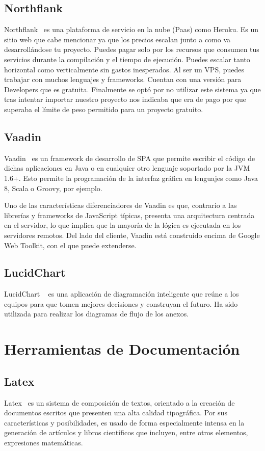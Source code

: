 \subsection{Northflank}
Northflank~\cite{Northflank} es una plataforma de servicio en la nube (Paas) como Heroku. Es un sitio web que cabe mencionar ya que los precios escalan junto a como va desarrollándose tu proyecto. Puedes pagar solo por los recursos que consumen tus servicios durante la compilación y el tiempo de ejecución. Puedes escalar tanto horizontal como verticalmente sin gastos inesperados. Al ser un VPS, puedes trabajar con muchos lenguajes y frameworks. Cuentan con una versión para Developers que es gratuita. 
Finalmente se optó por no utilizar este sistema ya que tras intentar importar nuestro proyecto nos indicaba que era de pago por que superaba el límite de peso permitido para un proyecto gratuito.

\subsection{Vaadin}
Vaadin~\cite{Vaadin} es un framework de desarrollo de SPA que permite escribir el código de dichas aplicaciones en Java o en cualquier otro lenguaje soportado por la JVM 1.6+. Esto permite la programación de la interfaz gráfica en lenguajes como Java 8, Scala o Groovy, por ejemplo.

Uno de las características diferenciadores de Vaadin es que, contrario a las librerías y frameworks de JavaScript típicas, presenta una arquitectura centrada en el servidor, lo que implica que la mayoría de la lógica es ejecutada en los servidores remotos. Del lado del cliente, Vaadin está construido encima de Google Web Toolkit, con el que puede extenderse.

\subsection{LucidChart}

LucidChart ~\cite{LucidChart} es una aplicación de diagramación inteligente que reúne a los equipos para que tomen mejores decisiones y construyan el futuro. Ha sido utilizada para realizar los diagramas de flujo de los anexos.

\section{Herramientas de Documentación}

\subsection{Latex}
 Latex~\cite{latex} es un sistema de composición de textos, orientado a la creación de documentos escritos que presenten una alta calidad tipográfica. Por sus características y posibilidades, es usado de forma especialmente intensa en la generación de artículos y libros científicos que incluyen, entre otros elementos, expresiones matemáticas.
 
